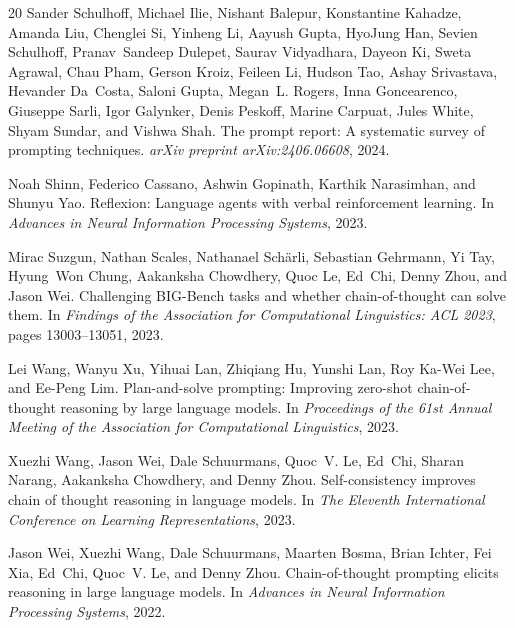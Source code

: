 \documentclass[11pt,a4paper]{article}
\begin{document}
\begin{thebibliography}{20}
Sander Schulhoff, Michael Ilie, Nishant Balepur, Konstantine Kahadze, Amanda Liu, Chenglei Si, Yinheng Li, Aayush Gupta, HyoJung Han, Sevien Schulhoff, Pranav~Sandeep Dulepet, Saurav Vidyadhara, Dayeon Ki, Sweta Agrawal, Chau Pham, Gerson Kroiz, Feileen Li, Hudson Tao, Ashay Srivastava, Hevander Da~Costa, Saloni Gupta, Megan~L. Rogers, Inna Goncearenco, Giuseppe Sarli, Igor Galynker, Denis Peskoff, Marine Carpuat, Jules White, Shyam Sundar, and Vishwa Shah.
\newblock The prompt report: A systematic survey of prompting techniques.
\newblock \emph{arXiv preprint arXiv:2406.06608}, 2024.

Noah Shinn, Federico Cassano, Ashwin Gopinath, Karthik Narasimhan, and Shunyu Yao.
\newblock Reflexion: Language agents with verbal reinforcement learning.
\newblock In \emph{Advances in Neural Information Processing Systems}, 2023.

Mirac Suzgun, Nathan Scales, Nathanael Sch{\"a}rli, Sebastian Gehrmann, Yi Tay, Hyung~Won Chung, Aakanksha Chowdhery, Quoc Le, Ed~Chi, Denny Zhou, and Jason Wei.
\newblock Challenging {BIG-Bench} tasks and whether chain-of-thought can solve them.
\newblock In \emph{Findings of the Association for Computational Linguistics: ACL 2023}, pages 13003--13051, 2023.

Lei Wang, Wanyu Xu, Yihuai Lan, Zhiqiang Hu, Yunshi Lan, Roy Ka-Wei Lee, and Ee-Peng Lim.
\newblock Plan-and-solve prompting: Improving zero-shot chain-of-thought reasoning by large language models.
\newblock In \emph{Proceedings of the 61st Annual Meeting of the Association for Computational Linguistics}, 2023.

Xuezhi Wang, Jason Wei, Dale Schuurmans, Quoc~V. Le, Ed~Chi, Sharan Narang, Aakanksha Chowdhery, and Denny Zhou.
\newblock Self-consistency improves chain of thought reasoning in language models.
\newblock In \emph{The Eleventh International Conference on Learning Representations}, 2023.

Jason Wei, Xuezhi Wang, Dale Schuurmans, Maarten Bosma, Brian Ichter, Fei Xia, Ed~Chi, Quoc~V. Le, and Denny Zhou.
\newblock Chain-of-thought prompting elicits reasoning in large language models.
\newblock In \emph{Advances in Neural Information Processing Systems}, 2022.


\end{thebibliography}
\end{document}
